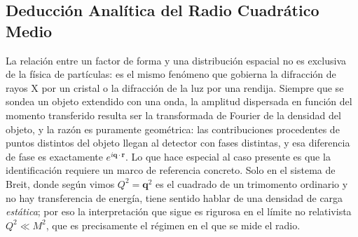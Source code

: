 \documentclass[10pt,a4paper]{article}
\begin{document}
\subsection{Deducción Analítica del Radio Cuadrático Medio}
La relación entre un factor de forma y una distribución espacial no es exclusiva de la física de partículas: es el mismo fenómeno que gobierna la difracción de rayos X por un cristal o la difracción de la luz por una rendija. Siempre que se sondea un objeto extendido con una onda, la amplitud dispersada en función del momento transferido resulta ser la transformada de Fourier de la densidad del objeto, y la razón es puramente geométrica: las contribuciones procedentes de puntos distintos del objeto llegan al detector con fases distintas, y esa diferencia de fase es exactamente $e^{i\mathbf{q}\cdot\mathbf{r}}$. Lo que hace especial al caso presente es que la identificación requiere un marco de referencia concreto. Solo en el sistema de Breit, donde según vimos $Q^2 = \mathbf{q}^2$ es el cuadrado de un trimomento ordinario y no hay transferencia de energía, tiene sentido hablar de una densidad de carga \emph{estática}; por eso la interpretación que sigue es rigurosa en el límite no relativista $Q^2 \ll M^2$, que es precisamente el régimen en el que se mide el radio.
\end{document}
